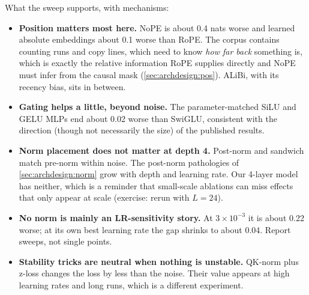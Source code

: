 What the sweep supports, with mechanisms:
\begin{itemize}
\item \textbf{Position matters most here.} NoPE is about 0.4 nats worse and learned absolute embeddings about 0.1
  worse than RoPE. The corpus contains counting runs and copy lines, which need to know \emph{how far back}
  something is, which is exactly the relative information RoPE supplies directly and NoPE must infer
  from the causal mask (\cref{sec:archdesign:pos}). ALiBi, with its recency bias, sits in between.
\item \textbf{Gating helps a little, beyond noise.} The parameter-matched SiLU and GELU MLPs end about 0.02
  worse than SwiGLU, consistent with the direction (though not necessarily the size) of the published
  results.
\item \textbf{Norm placement does not matter at depth 4.} Post-norm and sandwich match pre-norm within
  noise. The post-norm pathologies of \cref{sec:archdesign:norm} grow with depth and learning rate. Our
  4-layer model has neither, which is a reminder that small-scale ablations can miss effects that only
  appear at scale (exercise: rerun with $L=24$).
\item \textbf{No norm is mainly an LR-sensitivity story.} At $3\times10^{-3}$ it is about 0.22 worse; at its own
  best learning rate the gap shrinks to about 0.04. Report sweeps, not single points.
\item \textbf{Stability tricks are neutral when nothing is unstable.} QK-norm plus z-loss changes the loss by
  less than the noise. Their value appears at high learning rates and long runs, which is a different
  experiment.
\end{itemize}



